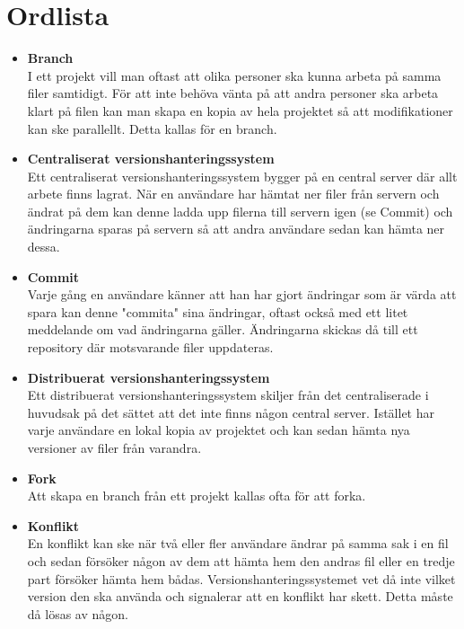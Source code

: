\section{Ordlista}
\begin{itemize}
	\item \textbf{Branch}
	\\I ett projekt vill man oftast att olika personer ska kunna arbeta på samma filer samtidigt. För att inte behöva vänta på att andra personer ska arbeta klart på filen kan man skapa en kopia av hela projektet så att modifikationer kan ske parallellt. Detta kallas för en branch.
	
	\item \textbf{Centraliserat versionshanteringssystem}
	\\Ett centraliserat versionshanteringssystem bygger på en central server där allt arbete finns lagrat. När en användare har hämtat ner filer från servern och ändrat på dem kan denne ladda upp filerna till servern igen (se Commit) och ändringarna sparas på servern så att andra användare sedan kan hämta ner dessa.
	
	\item \textbf{Commit}
	\\Varje gång en användare känner att han har gjort ändringar som är värda att spara kan denne "commita" sina ändringar, oftast också med ett litet meddelande om vad ändringarna gäller. Ändringarna skickas då till ett repository där motsvarande filer uppdateras.
	
	\item \textbf{Distribuerat versionshanteringssystem}
	\\Ett distribuerat versionshanteringssystem skiljer från det centraliserade i huvudsak på det sättet att det inte finns någon central server. Istället har varje användare en lokal kopia av projektet och kan sedan hämta nya versioner av filer från varandra.
	
	\item \textbf{Fork}
	\\Att skapa en branch från ett projekt kallas ofta för att forka.
	
	\item \textbf{Konflikt}
	\\En konflikt kan ske när två eller fler användare ändrar på samma sak i en fil och sedan försöker någon av dem att hämta hem den andras fil eller en tredje part försöker hämta hem bådas. Versionshanteringssystemet vet då inte vilket version den ska använda och signalerar att en konflikt har skett. Detta måste då lösas av någon.


\end{itemize}
